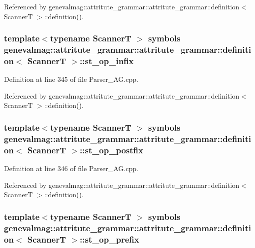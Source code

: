Referenced by genevalmag::attritute\_\-grammar::attritute\_\-grammar::definition$<$ ScannerT $>$::definition().\hypertarget{structgenevalmag_1_1attritute__grammar_1_1definition_3115ebd00c2fa0e1acbb3d8c5feacf49}{
\subsubsection[{st\_\-op\_\-infix}]{\setlength{\rightskip}{0pt plus 5cm}template$<$typename ScannerT $>$ symbols genevalmag::attritute\_\-grammar::attritute\_\-grammar::definition$<$ ScannerT $>$::{\bf st\_\-op\_\-infix}}}
\label{structgenevalmag_1_1attritute__grammar_1_1definition_3115ebd00c2fa0e1acbb3d8c5feacf49}




Definition at line 345 of file Parser\_\-AG.cpp.

Referenced by genevalmag::attritute\_\-grammar::attritute\_\-grammar::definition$<$ ScannerT $>$::definition().\hypertarget{structgenevalmag_1_1attritute__grammar_1_1definition_ef5020d6d3589e9eeabfdf0577efd4e0}{
\subsubsection[{st\_\-op\_\-postfix}]{\setlength{\rightskip}{0pt plus 5cm}template$<$typename ScannerT $>$ symbols genevalmag::attritute\_\-grammar::attritute\_\-grammar::definition$<$ ScannerT $>$::{\bf st\_\-op\_\-postfix}}}
\label{structgenevalmag_1_1attritute__grammar_1_1definition_ef5020d6d3589e9eeabfdf0577efd4e0}




Definition at line 346 of file Parser\_\-AG.cpp.

Referenced by genevalmag::attritute\_\-grammar::attritute\_\-grammar::definition$<$ ScannerT $>$::definition().\hypertarget{structgenevalmag_1_1attritute__grammar_1_1definition_56b9f9363511fb9e4d5091bb40cb6c1b}{
\subsubsection[{st\_\-op\_\-prefix}]{\setlength{\rightskip}{0pt plus 5cm}template$<$typename ScannerT $>$ symbols genevalmag::attritute\_\-grammar::attritute\_\-grammar::definition$<$ ScannerT $>$::{\bf st\_\-op\_\-prefix}}}
\label{structgenevalmag_1_1attritute__grammar_1_1definition_56b9f9363511fb9e4d5091bb40cb6c1b}




